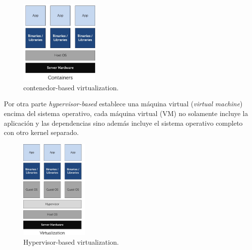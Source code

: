 	\begin{figure}[]
  		\centering
    	\includegraphics[width=0.35\textwidth]{Figures/containers.png}
    	\caption{contenedor-based virtualization.}
    	\label{fig:contenedor-arch}
	\end{figure}
	Por otra parte \textit{hypervisor-based} establece una máquina virtual (\textit{virtual
	machine})   encima del sistema operativo, cada máquina virtual (VM) no solamente
	incluye la aplicación y las dependencias sino además incluye el sistema 
	operativo completo con otro kernel separado.

	\begin{figure}[]
 		\centering
    	\includegraphics[width=0.3\textwidth]{Figures/virtual.png}
    	\caption{Hypervisor-based virtualization.}
    	\label{fig:vm-arch}
	\end{figure}

